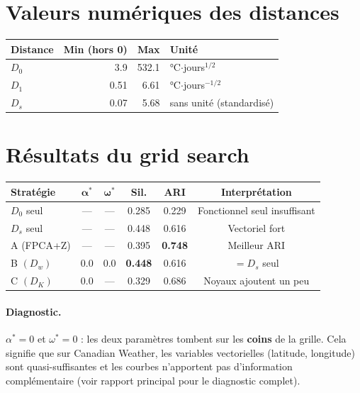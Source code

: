 \documentclass[11pt, a4paper]{article}
\newcommand{\Dw}{D_w}
\newcommand{\DK}{D_K}
\theoremstyle{definition}
\theoremstyle{remark}
\begin{document}
\section{Valeurs numériques des distances}

\begin{center}
\begin{tabular}{lrrl}
  \toprule
  \textbf{Distance} & \textbf{Min} (hors 0) & \textbf{Max} & \textbf{Unité} \\
  \midrule
  $D_0$ & 3.9  & 532.1 & °C$\cdot$jours$^{1/2}$ \\
  $D_1$ & 0.51 & 6.61  & °C$\cdot$jours$^{-1/2}$ \\
  $D_s$ & 0.07 & 5.68  & sans unité (standardisé) \\
  \bottomrule
\end{tabular}
\end{center}

\section{Résultats du grid search}

\begin{center}
\begin{tabular}{lccccc}
  \toprule
  \textbf{Stratégie} & $\boldsymbol{\alpha^*}$ & $\boldsymbol{\omega^*}$ & \textbf{Sil.} & \textbf{ARI} & \textbf{Interprétation} \\
  \midrule
  $D_0$ seul   & — & — & 0.285 & 0.229 & Fonctionnel seul insuffisant \\
  $D_s$ seul   & — & — & 0.448 & 0.616 & Vectoriel fort \\
  A (FPCA+Z)   & — & — & 0.395 & \textbf{0.748} & Meilleur ARI \\
  B $(\Dw)$    & 0.0 & 0.0 & \textbf{0.448} & 0.616 & $= D_s$ seul \\
  C $(\DK)$    & 0.0 & — & 0.329 & 0.686 & Noyaux ajoutent un peu \\
  \bottomrule
\end{tabular}
\end{center}

\paragraph{Diagnostic.}
$\alpha^* = 0$ et $\omega^* = 0$ : les deux paramètres tombent sur les
\textbf{coins} de la grille. Cela signifie que sur Canadian Weather, les
variables vectorielles (latitude, longitude) sont quasi-suffisantes et les
courbes n'apportent pas d'information complémentaire (voir rapport principal
pour le diagnostic complet).
\end{document}
